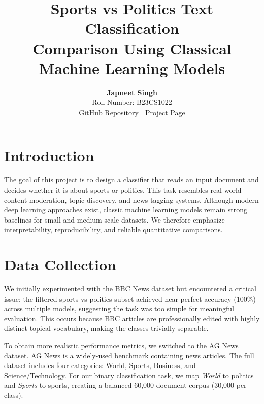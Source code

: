 \documentclass[12pt]{article}
\title{
\vspace{-1.5cm}
\textbf{\Huge Sports vs Politics Text Classification}\\[0.5em]
\large  Comparison Using Classical Machine Learning Models
}
\author{
\textbf{Japneet Singh}\\
Roll Number: B23CS1022\\
\vspace{0.5em}
\small
\href{https://github.com/japneet1234/NLU_Problem4}{GitHub Repository} $\mid$ 
\href{https://japneet1234.github.io/NLU_Problem4/}{Project Page}
}
\date{}
\begin{document}
\maketitle
\onehalfspacing


\section{Introduction}
The goal of this project is to design a classifier that reads an input document and decides whether it is about sports or politics. This task resembles real-world content moderation, topic discovery, and news tagging systems. Although modern deep learning approaches exist, classic machine learning models remain strong baselines for small and medium-scale datasets. We therefore emphasize interpretability, reproducibility, and reliable quantitative comparisons.

\section{Data Collection}
We initially experimented with the BBC News dataset but encountered a critical issue: the filtered sports vs politics subset achieved near-perfect accuracy (100\%) across multiple models, suggesting the task was too simple for meaningful evaluation. This occurs because BBC articles are professionally edited with highly distinct topical vocabulary, making the classes trivially separable.

To obtain more realistic performance metrics, we switched to the AG News dataset. AG News is a widely-used benchmark containing news articles. The full dataset includes four categories: World, Sports, Business, and Science/Technology. For our binary classification task, we map \textit{World} to politics and \textit{Sports} to sports, creating a balanced 60,000-document corpus (30,000 per class).
\end{document}
